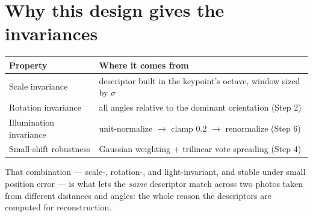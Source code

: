 \documentclass[11pt]{article}
\begin{document}
\section{Why this design gives the invariances}

\begin{center}
\renewcommand{\arraystretch}{1.3}
\begin{tabular}{>{\raggedright}p{} p{}}
\toprule
\textbf{Property} & \textbf{Where it comes from} \\
\midrule
Scale invariance        & descriptor built in the keypoint's octave, window sized by $\sigma$ \\
Rotation invariance     & all angles relative to the dominant orientation (Step 2) \\
Illumination invariance & unit-normalize $\rightarrow$ clamp $0.2$ $\rightarrow$ renormalize (Step 6) \\
Small-shift robustness  & Gaussian weighting + trilinear vote spreading (Step 4) \\
\bottomrule
\end{tabular}
\end{center}

That combination --- scale-, rotation-, and light-invariant, and stable under small position
error --- is what lets the \emph{same} descriptor match across two photos taken from
different distances and angles: the whole reason the descriptors are computed for
reconstruction.
\end{document}
